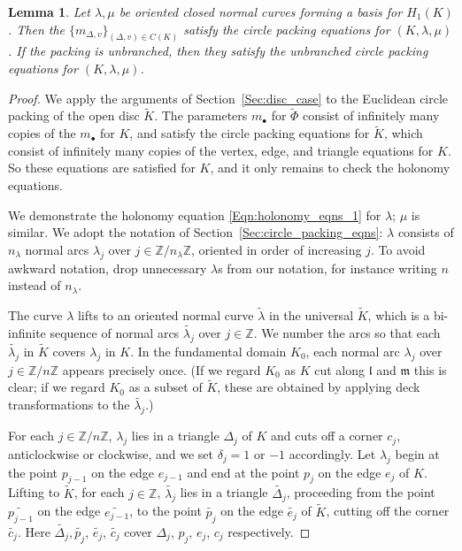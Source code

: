 \documentclass[12pt]{amsart}
\numberwithin{equation}{section}
\newtheorem{lem}[equation]{Lemma}
\theoremstyle{named}
\newcommand{\refsec}[1]{Section~\ref{Sec:#1}}
\newcommand{\refeqn}[1]{\eqref{Eqn:#1}}
\newcommand{\Z}{\mathbb{Z}}
\begin{document}
\begin{lem}
\label{Lem:torus_packings_give_solutions}
Let $\lambda, \mu$ be oriented closed normal curves forming a basis for $H_1 (K)$. Then the $\{m_{\Delta,v}\}_{(\Delta,v) \in C(K)}$ satisfy the circle packing equations for $(K, \lambda, \mu)$. If the packing is unbranched, then they satisfy the unbranched circle packing equations for $(K, \lambda, \mu)$.
\end{lem}

\begin{proof}
We apply the arguments of \refsec{disc_case} to the Euclidean circle packing of the open disc $\widetilde{K}$. The parameters $m_\bullet$ for $\widetilde{\Phi}$ consist of infinitely many copies of the $m_\bullet$ for $K$, and satisfy the circle packing equations for $\widetilde{K}$, which consist of infinitely many copies of the vertex, edge, and triangle equations for $K$. So these equations are satisfied for $K$, and it only remains to check the holonomy equations. 

We demonstrate the holonomy equation \refeqn{holonomy_eqns_1} for $\lambda$; $\mu$ is similar. We adopt the notation of \refsec{circle_packing_eqns}: $\lambda$ consists of $n_\lambda$ normal arcs $\lambda_j$ over $j \in \Z/n_\lambda \Z$, oriented in order of increasing $j$. To avoid awkward notation, drop unnecessary $\lambda$s from our notation, for instance writing $n$ instead of $n_\lambda$. 

The curve $\lambda$ lifts to an oriented normal curve $\widetilde{\lambda}$ in the universal $\widetilde{K}$, which is a bi-infinite sequence of normal arcs $\widetilde{\lambda_j}$ over $j \in \Z$. We number the arcs so that each $\widetilde{\lambda_j}$ in $\widetilde{K}$ covers $\lambda_j$ in $K$. In the fundamental domain $K_0$, each normal arc $\lambda_j$ over $j \in \Z/n \Z$ appears precisely once. (If we regard $K_0$ as $K$ cut along $\mathfrak{l}$ and $\mathfrak{m}$ this is clear; if we regard $K_0$ as a subset of $\widetilde{K}$, these are obtained by applying deck transformations to the $\widetilde{\lambda_j}$.)

For each $j \in \Z/n \Z$, $\lambda_j$ lies in a triangle $\Delta_j$ of $K$ and cuts off a corner $c_j$, anticlockwise or clockwise, and we set $\delta_j = 1$ or $-1$ accordingly. Let $\lambda_j$ begin at the point $p_{j-1}$ on the edge $e_{j-1}$ and end at the point $p_j$ on the edge $e_j$ of $K$. Lifting to $\widetilde{K}$, for each $j \in \Z$, $\widetilde{\lambda_j}$ lies in a triangle $\widetilde{\Delta_j}$, proceeding from the point $\widetilde{p_{j-1}}$ on the edge $\widetilde{e_{j-1}}$, to the point $\widetilde{p_j}$ on the edge $\widetilde{e_j}$ of $\widetilde{K}$, cutting off the corner $\widetilde{c_j}$. Here $\widetilde{\Delta_j}, \widetilde{p_j}$, $\widetilde{e_j}$, $\widetilde{c_j}$ cover $\Delta_j$, $p_j$, $e_j$, $c_j$ respectively.


\end{proof}
\end{document}
